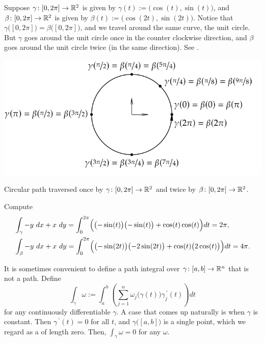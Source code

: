 \begin{example}
Suppose $\gamma \colon [0,2\pi] \to {\mathbb{R}}^2$ is given by $\gamma(t) :=
\bigl(\cos(t),\sin(t)\bigr)$, and
$\beta \colon [0,2\pi] \to {\mathbb{R}}^2$ is given by $\beta(t) :=
\bigl(\cos(2t),\sin(2t)\bigr)$.  Notice that
$\gamma\bigl([0,2\pi]\bigr) = \beta\bigl([0,2\pi]\bigr)$, and we travel
around the same curve, the unit circle.  But $\gamma$ goes around the unit
circle once in the counter clockwise direction, and $\beta$ goes around the
unit circle twice (in the same direction). 
See .
\begin{myfigureht}
\includegraphics{figures/circlepathrepar2}
\caption{Circular path traversed once by
$\gamma \colon [0,2\pi] \to {\mathbb{R}}^2$
and twice by
$\beta \colon [0,2\pi] \to {\mathbb{R}}^2$.\label{fig:circlepathrepar2}}
\end{myfigureht}

Compute
\begin{align*}
& \int_{\gamma} -y~ dx + x~dy
=
\int_0^{2\pi}
\Bigl( \bigl(-\sin(t) \bigr) \bigl(-\sin(t) \bigr) + \cos(t) \cos(t) \Bigr) dt
=
2 \pi,\\
& \int_{\beta} -y~ dx + x~dy
=
\int_0^{2\pi}
\Bigl( \bigl(-\sin(2t) \bigr) \bigl(-2\sin(2t) \bigr) + \cos(t)
\bigl(2\cos(t)\bigr) \Bigr) dt
=
4 \pi.
\end{align*}
\end{example}

It is sometimes convenient to define a path integral over $\gamma \colon
[a,b] \to {\mathbb{R}}^n$ that is not a path.
Define
\begin{equation*}
\int_{\gamma} \omega := \int_a^b
\left(
\sum_{j=1}^n
\omega_j\bigl(\gamma(t)\bigr) \gamma_j^{\:\prime}(t)
\right) dt 
\end{equation*}
for any continuously differentiable $\gamma$.  A 
case that comes up naturally is when $\gamma$ is constant.  Then
$\gamma^{\:\prime}(t) = 0$ for all $t$, and $\gamma\bigl([a,b]\bigr)$ is a single
point, which we regard as a  of length zero.  Then,
$\int_{\gamma} \omega = 0$ for any $\omega$.

